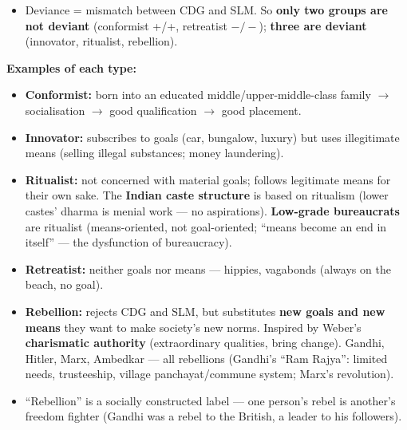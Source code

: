 \begin{KeyConcept}
\begin{itemize}
\item Deviance = mismatch between CDG and SLM. So \textbf{only two groups are not deviant} (conformist +/+, retreatist $-/-$); \textbf{three are deviant} (innovator, ritualist, rebellion).
\end{itemize}
\end{KeyConcept}

\begin{ExampleBox}
\textbf{Examples of each type:}
\begin{itemize}
\item \textbf{Conformist:} born into an educated middle/upper-middle-class family $\rightarrow$ socialisation $\rightarrow$ good qualification $\rightarrow$ good placement.
\item \textbf{Innovator:} subscribes to goals (car, bungalow, luxury) but uses illegitimate means (selling illegal substances; money laundering).
\item \textbf{Ritualist:} not concerned with material goals; follows legitimate means for their own sake. The \textbf{Indian caste structure} is based on ritualism (lower castes' dharma is menial work --- no aspirations). \textbf{Low-grade bureaucrats} are ritualist (means-oriented, not goal-oriented; ``means become an end in itself'' --- the dysfunction of bureaucracy).
\item \textbf{Retreatist:} neither goals nor means --- hippies, vagabonds (always on the beach, no goal).
\item \textbf{Rebellion:} rejects CDG and SLM, but substitutes \textbf{new goals and new means} they want to make society's new norms. Inspired by Weber's \textbf{charismatic authority} (extraordinary qualities, bring change). Gandhi, Hitler, Marx, Ambedkar --- all rebellions (Gandhi's ``Ram Rajya'': limited needs, trusteeship, village panchayat/commune system; Marx's revolution).
\end{itemize}
\end{ExampleBox}

\begin{CriticalPoint}
\begin{itemize}
\item ``Rebellion'' is a socially constructed label --- one person's rebel is another's freedom fighter (Gandhi was a rebel to the British, a leader to his followers).
\end{itemize}
\end{CriticalPoint}

